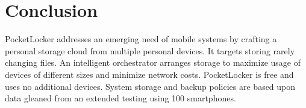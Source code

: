 
\section{Conclusion}
\label{sec-conclusion}

PocketLocker addresses an emerging need of mobile systems by crafting a
personal storage cloud from multiple personal devices.  It targets storing
rarely changing files. An intelligent orchestrator arranges storage to
maximize usage of devices of different sizes and minimize network costs.
PocketLocker is free and uses no additional devices. System storage and
backup policies are based upon data gleaned from an extended testing using
100 smartphones.
\newpage
